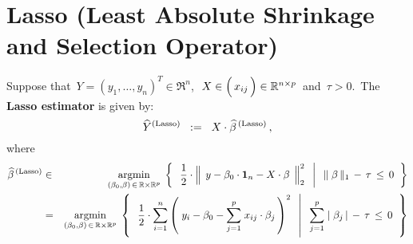 
\section{Lasso (Least Absolute Shrinkage and Selection Operator)}
\setcounter{theorem}{0}

\renewcommand{\theenumi}{\roman{enumi}}
\renewcommand{\labelenumi}{\textnormal{(\theenumi)}$\;\;$}


Suppose that
\,$Y = (y_{1},\ldots,y_{n})^{T} \in \Re^{n}$,\,
\,$X \in \left(\,\overset{{\color{white}-}}{x_{ij}}\,\right)\in\Re^{n \times p}$\, and
\,$\tau > 0$.\,
The \textbf{Lasso estimator} is given by:
\begin{equation*}
\widehat{Y}^{\textnormal{(Lasso)}}
\;\; := \;\;
	X \cdot \widehat{\beta}^{\,\textnormal{(Lasso)}}\,,
\end{equation*}
where
\begin{eqnarray*}
\widehat{\beta}^{\,\textnormal{(Lasso)}}
& \in &
	\underset{(\beta_{0},\beta)\,\in\,\Re\times\Re^{p}}{\argmin}\;
	\left\{\;\;
		\left.
		\dfrac{1}{2}
		\cdot
		\left\Vert\;\, y \overset{{\color{white}.}}{-} \beta_{0}\cdot\mathbf{1}_{n} - X\cdot\beta \,\;\right\Vert_{2}^{2}
		\;\;\,\right\vert\;\;
		\Vert\;\beta\,\Vert_{1} \, - \, \tau \, \leq \, 0
		\;\;\right\}
\\
& = &
	\underset{(\beta_{0},\beta)\,\in\,\Re\times\Re^{p}}{\argmin}\;
	\left\{\;\;
		\left.
		\dfrac{1}{2}
		\cdot
		\overset{n}{\underset{i=1}{\sum}}
		\left(\; y_{i} - \beta_{0} - \overset{p}{\underset{j=1}{\sum}}\; x_{ij}\cdot\beta_{j}\,\right)^{2}
		\;\;\,\right\vert\;\;
		\overset{p}{\underset{j=1}{\sum}}\;
		\vert\;\beta_{j}\,\vert
		\, - \,
		\tau \, \leq \, 0
		\;\;\right\}
\end{eqnarray*}


